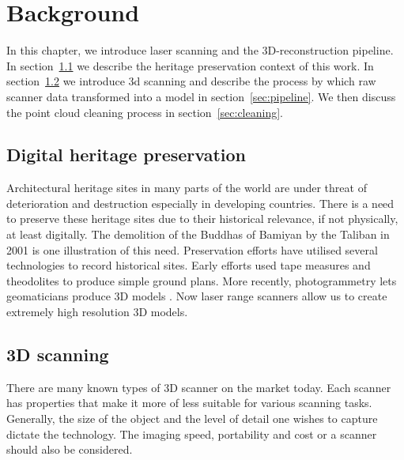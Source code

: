 \chapter{Background} \label{ch:background}


In this chapter, we introduce laser scanning and the 3D-reconstruction pipeline. In section~\ref{sec:heritage} we describe the heritage preservation context of this work. In section~\ref{sec:scanners} we introduce 3d scanning and describe the process by which raw scanner data transformed into a model in section~\ref{sec:pipeline}. We then discuss the point cloud cleaning process in section~\ref{sec:cleaning}.


\section{Digital heritage preservation} \label{sec:heritage}

Architectural heritage sites in many parts of the world are under threat of deterioration and destruction especially in developing countries. There is a need to preserve these heritage sites due to their historical relevance, if not physically, at least digitally. The demolition of  the Buddhas of Bamiyan by the Taliban in 2001 \cite{Toubekis2009} is one illustration of this need. Preservation efforts have utilised several technologies to record historical sites. Early efforts used tape measures and theodolites to produce simple ground plans.  More recently, photogrammetry lets geomaticians produce 3D models \cite{Heritage}. Now laser range scanners allow us to create extremely high resolution 3D models.


\section{3D scanning} \label{sec:scanners}


There are many known types of 3D scanner on the market today. Each scanner has properties that make it more of less suitable for various scanning tasks. Generally, the size of the object and the level of detail one wishes to capture dictate the technology. The imaging speed, portability and cost or a scanner should also be considered.

